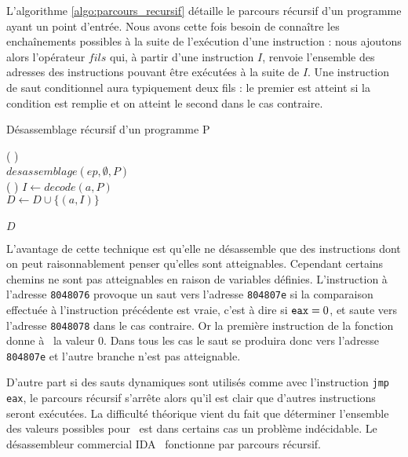 L'algorithme \ref{algo:parcours_recursif} détaille le parcours récursif d'un programme ayant un point d'entrée.
Nous avons cette fois besoin de connaître les enchaînements possibles à la suite de l'exécution d'une instruction : nous ajoutons alors l'opérateur $fils$ qui, à partir d'une instruction $I$, renvoie l'ensemble des adresses des instructions pouvant être exécutées à la suite de $I$.
Une instruction de saut conditionnel aura typiquement deux fils : le premier est atteint si la condition est remplie et on atteint le second dans le cas contraire.

\begin{algorithm}[H] %
\caption{Désassemblage récursif d'un programme P}
\SetAlgoLined
{}
\Fn(
){}{
\\
\Return $desassemblage(ep, \emptyset, P)$
}
~\\
\Fn(
){}{
  $I\leftarrow decode(a, P)$ \\
  $D\leftarrow D\cup \{(a, I)\}$ \\
  \\
  {
  }
  \Return $D$
}
\label{algo:parcours_recursif}
\end{algorithm}

L'avantage de cette technique est qu'elle ne désassemble que des instructions dont on peut raisonnablement penser qu'elles sont atteignables.
Cependant certains chemins ne sont pas atteignables en raison de variables définies. 
L'instruction à l'adresse \texttt{8048076} provoque un saut vers l'adresse \texttt{804807e} si la comparaison effectuée à l'instruction précédente est vraie, c'est à dire si $\texttt{eax}=0$, et saute vers l'adresse \texttt{8048078} dans le cas contraire.
Or la première instruction de la fonction donne à \eax\ la valeur 0. Dans tous les cas le saut se produira donc vers l'adresse \texttt{804807e} et l'autre branche n'est pas atteignable.

D'autre part si des sauts dynamiques sont utilisés comme avec l'instruction \texttt{jmp eax}, le parcours récursif s'arrête alors qu'il est clair que d'autres instructions seront exécutées.
La difficulté théorique vient du fait que déterminer l'ensemble des valeurs possibles pour \eax\ est dans certains cas un problème indécidable.
Le désassembleur commercial IDA~\cite{IDA} fonctionne par parcours récursif.


